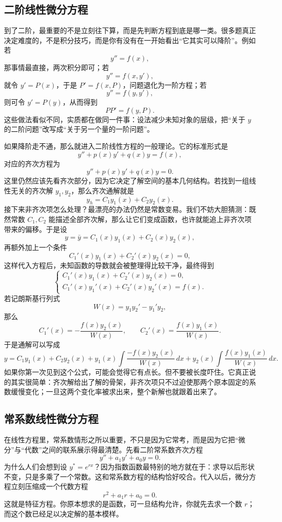 \documentclass[UTF8]{ctexbook}
\begin{document}
\subsection{二阶线性微分方程}
到了二阶，最重要的不是立刻往下算，而是先判断方程到底是哪一类。很多题真正决定难度的，不是积分技巧，而是你有没有在一开始看出“它其实可以降阶”。例如若
\[
y''=f(x),
\]
那事情最直接，两次积分即可；若
\[
y''=f(x,y'),
\]
就令 $y'=P(x)$，于是 $P'=f(x,P)$，问题退化为一阶方程；若
\[
y''=f(y,y'),
\]
则可令 $y'=P(y)$，从而得到
\[
PP'=f(y,P).
\]
这些做法看似不同，实质都在做同一件事：设法减少未知对象的层级，把“关于 $y$ 的二阶问题”改写成“关于另一个量的一阶问题”。

如果降阶走不通，那么就进入二阶线性方程的一般理论。它的标准形式是
\[
y''+p(x)y'+q(x)y=f(x),
\]
对应的齐次方程为
\[
y''+p(x)y'+q(x)y=0.
\]
这里仍然应该先看齐次部分，因为它决定了解空间的基本几何结构。若找到一组线性无关的齐次解 $y_1,y_2$，那么齐次通解就是
\[
y_h=C_1y_1(x)+C_2y_2(x).
\]
接下来非齐次项怎么处理？最漂亮的办法仍然是常数变易。我们不妨大胆猜测：既然常数 $C_1,C_2$ 能描述全部齐次解，那么让它们变成函数，也许就能追上非齐次项带来的偏移。于是设
\[
y=\bar y=C_1(x)y_1(x)+C_2(x)y_2(x),
\]
再额外加上一个条件
\[
C_1'(x)y_1(x)+C_2'(x)y_2(x)=0,
\]
这样代入方程后，未知函数的导数就会被整理得比较干净，最终得到
\[
\begin{cases}
C_1'(x)y_1(x)+C_2'(x)y_2(x)=0,\\
C_1'(x)y_1'(x)+C_2'(x)y_2'(x)=f(x).
\end{cases}
\]
若记朗斯基行列式
\[
W(x)=y_1y_2'-y_1'y_2,
\]
那么
\[
C_1'(x)=-\frac{f(x)y_2(x)}{W(x)},\qquad
C_2'(x)=\frac{f(x)y_1(x)}{W(x)}.
\]
于是通解可以写成
\[
y=C_1y_1(x)+C_2y_2(x)+y_1(x)\int\frac{-f(x)y_2(x)}{W(x)}\,dx+y_2(x)\int\frac{f(x)y_1(x)}{W(x)}\,dx.
\]
如果你第一次见到这个公式，可能会觉得它有点长。但不要被长度吓住。它真正说的其实很简单：齐次解给出了解的骨架，非齐次项只不过迫使那两个原本固定的系数缓慢变化；一旦这两个变化率被求出来，整个新解也就跟着出来了。

\subsection{常系数线性微分方程}
在线性方程里，常系数情形之所以重要，不只是因为它常考，而是因为它把“微分”与“代数”之间的联系展示得最清楚。先看二阶常系数齐次方程
\[
y''+a_1y'+a_0y=0.
\]
为什么人们会想到设 $y^*=e^{rx}$？因为指数函数最特别的地方就在于：求导以后形状不变，只是多乘了一个常数。这和常系数方程的结构恰好咬合。代入以后，微分方程立刻压缩成一个代数方程
\[
r^2+a_1r+a_0=0.
\]
这就是特征方程。你原本想求的是函数，可一旦结构允许，你就先去求一个数 $r$；而这个数已经足以决定解的基本模样。
\end{document}
